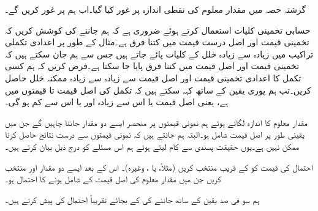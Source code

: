 گزشتہ حصہ میں مقدار معلوم کی نقطی اندازہ پر غور کیا گیا۔اب ہم  پر غور کریں گے۔

حسابی تخمینی کلیات استعمال کرتے ہوئے ضروری ہے کہ ہم جاننے کی کوشش کریں کہ  تخمینی قیمت اور اصل درست قیمت میں کتنا فرق ہے۔مثال کے طور پر اعدادی تکملی تراکیب میں زیادہ سے زیادہ خلل کے کلیات پائے جاتے ہیں جس سے ہم جان سکتے ہیں کہ تخمینی قیمت اور  اصل قیمت میں کتنا فرق پایا جا سکتا ہے۔فرض کریں کہ ہم کسی تکمل کا اعدادی تخمینی قیمت   اور اصل قیمت سے زیادہ سے زیادہ ممکنہ خلل  حاصل کریں۔تب ہم پوری یقین کے ساتھ کہہ سکتے ہیں کہ تکمل کی اصل قیمت  تا   قیمتوں میں  ہے، یعنی اصل قیمت   یا اس سے زیادہ اور   یا اس سے کم ہو گی۔

مقدار معلوم  کا اندازہ  لگاتے ہوئے ہم نمونی قیمتوں پر منحصر ایسے دو مقدار جاننا چاہیں گے جن میں یقینی طور پر اصل قیمت شامل ہو۔البتہ ہم جانتے ہیں کہ نمونی قیمتوں سے   درست نتائج حاصل کرنا ممکن نہیں ہے۔یوں حقیقت پسندی سے کام  لیتے ہوئے ہم اس مسئلے کو درج ذیل بیان کرتے ہیں۔

احتمال  کی قیمت کو  کے قریب منتخب کریں (مثلاً،  یا ، وغیرہ)۔ اس کے بعد ایسے  دو مقدار  اور  منتخب کریں جن میں مقدار معلوم  کی اصل قیمت کے شامل ہونے کا احتمال  ہو۔

ہم سو فی صد یقین کے ساتھ جاننے کی  کے بجائے تقریباً  احتمال کی  پیش کرتے ہیں۔

